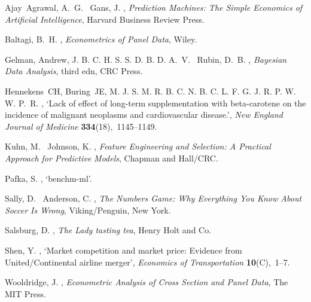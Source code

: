 %
%
\begin{thebibliography}{}

Ajay~Agrawal, A.~G. \harvardand\ Gans, J.  \harvardyearright , {\em Prediction Machines: The Simple Economics of
  Artificial Intelligence}, Harvard Business Review Press.

Baltagi, B.~H.  \harvardyearright , {\em Econometrics of
  Panel Data}, Wiley.

Gelman, Andrew, J. B. C. H. S. S. D. B. D. A.~V. \harvardand\ Rubin, D.~B.
  \harvardyearright , {\em Bayesian Data Analysis}, third
  edn, CRC Press.
\newline{}

Hennekens~CH, Buring~JE, M. J. S. M. R. B. C. N. B. C. L. F. G. J. R. P. W. W.
  P.~R.  \harvardyearright , `Lack of effect of long-term
  supplementation with beta-carotene on the incidence of malignant neoplasms
  and cardiovascular disease.', {\em New England Journal of Medicine} {\bf
  334}(18),~1145--1149.

Kuhn, M. \harvardand\ Johnson, K.  \harvardyearright ,
  {\em Feature Engineering and Selection: A Practical Approach for Predictive
  Models}, Chapman and Hall/CRC.

Pafka, S.  \harvardyearright , `benchm-ml'.
\newline{}

Sally, D. \harvardand\ Anderson, C.  \harvardyearright ,
  {\em The Numbers Game: Why Everything You Know About Soccer Is Wrong},
  Viking/Penguin, New York.

Salsburg, D.  \harvardyearright , {\em The Lady tasting
  tea}, Henry Holt and Co.

Shen, Y.  \harvardyearright , `{Market competition and
  market price: Evidence from United/Continental airline merger}', {\em
  Economics of Transportation} {\bf 10}(C),~\hbox{1--7}.

Wooldridge, J.  \harvardyearright , {\em Econometric
  Analysis of Cross Section and Panel Data}, The MIT Press.

\end{thebibliography}



